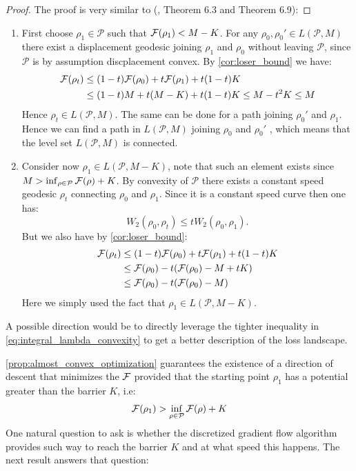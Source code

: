 %
\begin{proof}
The proof is very similar to (\cite{Bottou:2017}, Theorem 6.3 and
Theorem 6.9): 
\end{proof}
\begin{enumerate}
\item First choose $\rho_{1}\in\mathcal{P}$ such that ${{\mathcal F}}(\rho_{1})<M-K$.
For any $\rho_{0},\rho_{0}'\in L(\mathcal{P},M)$ there exist a displacement
geodesic joining $\rho_{1}$ and $\rho_{0}$ without leaving $\mathcal{P}$,
since $\mathcal{P}$ is by assumption discplacement convex. By \cref{cor:loser_bound}
we have:
\begin{align*}
{{\mathcal F}}(\rho_{t}) & \leq(1-t){{\mathcal F}}(\rho_{0})+t{{\mathcal F}}(\rho_{1})+t(1-t)K\\
 & \leq(1-t)M+t(M-K)+t(1-t)K\leq M-t^{2}K\leq M
\end{align*}
Hence $\rho_{t}\in L(\mathcal{P},M)$. The same can be done for a
path joining $\rho_{0}'$ and $\rho_{1}$. Hence we can find a path
in $L(\mathcal{P},M)$ joining $\rho_{0}$ and $\rho_{0}'$ , which
means that the level set $L(\mathcal{P},M)$ is connected.
\item Consider now $\rho_{1}\in L(\mathcal{P},M-K)$, note that such an
element exists since $M>\inf_{\rho\in\mathcal{P}}{{\mathcal F}}(\rho)+K$.
By convexity of $\mathcal{P}$ there exists a constant speed geodesic
$\rho_{t}$ connecting $\rho_{0}$ and $\rho_{1}$. Since it is a
constant speed curve then one has:
\[
W_{2}(\rho_{0},\rho_{t})\leq tW_{2}(\rho_{0},\rho_{1}).
\]
But we also have by \cref{cor:loser_bound}:
\begin{align*}
{{\mathcal F}}(\rho_{t}) & \leq(1-t){{\mathcal F}}(\rho_{0})+t{{\mathcal F}}(\rho_{1})+t(1-t)K\\
 & \leq {{\mathcal F}}(\rho_{0})-t({{\mathcal F}}(\rho_{0})-M+tK)\\
 & \leq {{\mathcal F}}(\rho_{0})-t({{\mathcal F}}(\rho_{0})-M)
\end{align*}
Here we simply used the fact that $\rho_{1}\in L(\mathcal{P},M-K)$. 
\end{enumerate}
%

\begin{remark}
	A possible direction would be to directly leverage the tighter inequality in \cref{eq:integral_lambda_convexity} to get a better description of the loss landscape.
\end{remark}

\cref{prop:almost_convex_optimization} guarantees the existence of a direction of descent that minimizes the ${{\mathcal F}}$ provided that the starting point $\rho_1$ has a potential greater than the barrier $K$, i.e:
\begin{align}\label{eq:barrier_condition}
	{{\mathcal F}}(\rho_1)> \inf_{\rho\in \mathcal{P}} {{\mathcal F}}(\rho) + K
\end{align}
One natural question to ask is whether the  discretized gradient flow algorithm provides such way to reach the barrier $K$ and at what speed this happens. The next result answers that question:   

